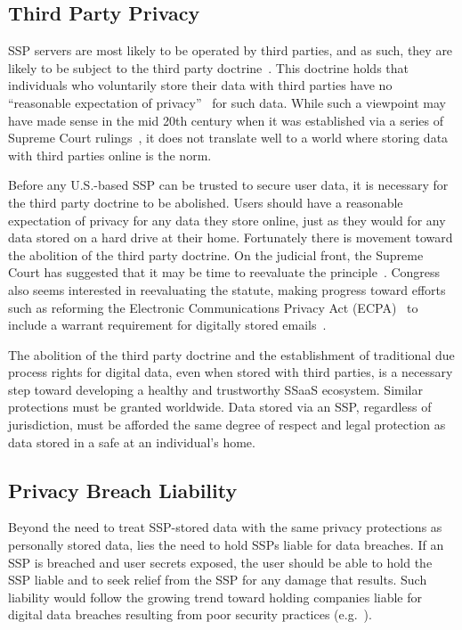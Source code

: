 \subsection{Third Party Privacy}

SSP servers are most likely to be operated by third parties, and as
such, they are likely to be subject to the third party
doctrine~\cite{thompson-thirdparty}. This doctrine holds that
individuals who voluntarily store their data with third parties have
no ``reasonable expectation of privacy''~\cite{scotus-katzvus} for
such data. While such a viewpoint may have made sense in the mid 20th
century when it was established via a series of Supreme Court
rulings~\cite{scotus-usvmiller-privacy, scotus-smithvmaryland}, it
does not translate well to a world where storing data with third
parties online is the norm.

Before any U.S.-based SSP can be trusted to secure user data, it is
necessary for the third party doctrine to be abolished. Users should
have a reasonable expectation of privacy for any data they store
online, just as they would for any data stored on a hard drive at
their home. Fortunately there is movement toward the abolition of the
third party doctrine. On the judicial front, the Supreme Court has
suggested that it may be time to reevaluate the
principle~\cite{scotus-usvjones}. Congress also seems interested in
reevaluating the statute, making progress toward efforts such as
reforming the Electronic Communications Privacy Act (ECPA)~\cite{ecpa}
to include a warrant requirement for digitally stored
emails~\cite{eff-ecpareform}.

The abolition of the third party doctrine and the establishment of
traditional due process rights for digital data, even when stored with
third parties, is a necessary step toward developing a healthy and
trustworthy SSaaS ecosystem. Similar protections must be granted
worldwide. Data stored via an SSP, regardless of jurisdiction, must be
afforded the same degree of respect and legal protection as data
stored in a safe at an individual's home.

\subsection{Privacy Breach Liability}
\label{chap:policy:trustworthiness:liability}

Beyond the need to treat SSP-stored data with the same privacy
protections as personally stored data, lies the need to hold SSPs
liable for data breaches. If an SSP is breached and user secrets
exposed, the user should be able to hold the SSP liable and to seek
relief from the SSP for any damage that results. Such liability would
follow the growing trend toward holding companies liable for digital
data breaches resulting from poor security practices
(e.g.~\cite{ftc-asus}).

